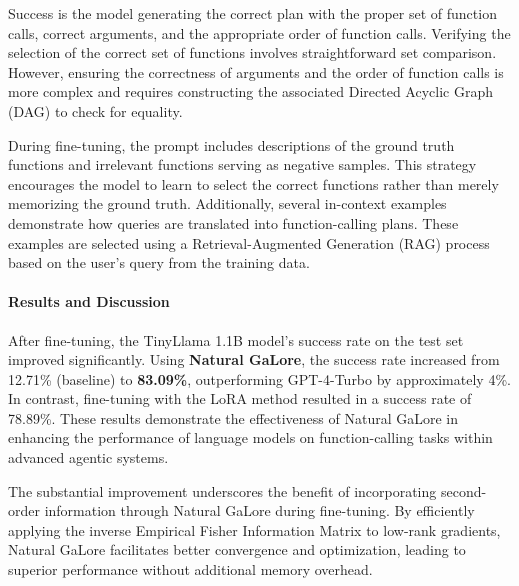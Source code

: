 Success is the model generating the correct plan with the proper set of function calls, correct arguments, and the appropriate order of function calls. Verifying the selection of the correct set of functions involves straightforward set comparison. However, ensuring the correctness of arguments and the order of function calls is more complex and requires constructing the associated Directed Acyclic Graph (DAG) to check for equality.

During fine-tuning, the prompt includes descriptions of the ground truth functions and irrelevant functions serving as negative samples. This strategy encourages the model to learn to select the correct functions rather than merely memorizing the ground truth. Additionally, several in-context examples demonstrate how queries are translated into function-calling plans. These examples are selected using a Retrieval-Augmented Generation (RAG) process based on the user's query from the training data.

\paragraph{Results and Discussion}

After fine-tuning, the TinyLlama 1.1B model's success rate on the test set improved significantly. Using \textbf{Natural GaLore}, the success rate increased from 12.71\% (baseline) to \textbf{83.09\%}, outperforming GPT-4-Turbo by approximately 4\%. In contrast, fine-tuning with the LoRA method resulted in a success rate of 78.89\%. These results demonstrate the effectiveness of Natural GaLore in enhancing the performance of language models on function-calling tasks within advanced agentic systems.

The substantial improvement underscores the benefit of incorporating second-order information through Natural GaLore during fine-tuning. By efficiently applying the inverse Empirical Fisher Information Matrix to low-rank gradients, Natural GaLore facilitates better convergence and optimization, leading to superior performance without additional memory overhead.

